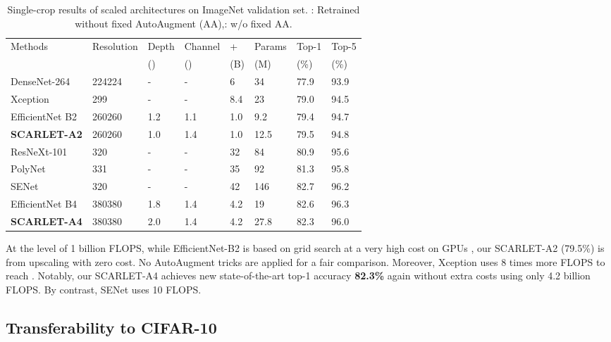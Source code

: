\documentclass[runningheads]{llncs}
\begin{document}
\setlength{\tabcolsep}{4pt}
\begin{table*}
	\caption{Single-crop results of scaled architectures on ImageNet validation set. : Retrained without fixed AutoAugment (AA),: w/o fixed AA.}
	\label{tab:scaling}
	\begin{center}
	\begin{footnotesize}
			\begin{tabular}{*{8}{|l}|} 		
				\hline
				Methods & Resolution & Depth& Channel & +  & Params & Top-1  & Top-5  \\
				&  & () &  () & (B) & (M) & (\%) & (\%) \\
				\hline
				DenseNet-264 \cite{huang2017densely} &224224&-&-& 6 & 34&77.9&93.9 \\
				Xception \cite{chollet2017xception} &299&-&-& 8.4 & 23 & 79.0 & 94.5 \\
				EfficientNet B2 \cite{tan2019efficientnet}& 260260 & 1.2 & 1.1 & 1.0  & 9.2 & 79.4 & 94.7 \\ \textbf{SCARLET-A2}  &260260 &1.0 &1.4& 1.0  & 12.5 & 79.5  & 94.8
				\\ \hline
				ResNeXt-101 \cite{xie2017aggregated} & 320 &-&-&32&84 & 80.9 & 95.6 \\
				PolyNet \cite{zhang2017polynet}  &331 &-&-& 35&92&81.3&95.8 \\
				SENet \cite{hu2018squeeze}
				&320&-&-&42 & 146 & 82.7 & 96.2 \\
				EfficientNet B4 \cite{tan2019efficientnet} &380380 &1.8& 1.4 & 4.2  & 19 & 82.6 & 96.3 \\
				\textbf{SCARLET-A4}  & 380380 & 2.0& 1.4& 4.2  & 27.8 & 82.3  & 96.0 \\
				\hline
			\end{tabular}
	\end{footnotesize}
	\end{center}
\end{table*}


At the level of 1 billion FLOPS, while EfficientNet-B2 is based on grid search at a very high cost on GPUs \cite{tan2019efficientnet}, our SCARLET-A2 (79.5\%) is from upscaling with zero cost. No AutoAugment tricks are applied for a fair comparison.  Moreover, Xception \cite{chollet2017xception} uses 8 times more FLOPS to reach .  Notably, our SCARLET-A4 achieves new state-of-the-art top-1 accuracy \textbf{82.3\%} again without extra costs using only 4.2 billion FLOPS. By contrast, SENet \cite{hu2018squeeze} uses 10 FLOPS.

\subsection{Transferability to CIFAR-10}
\end{document}
